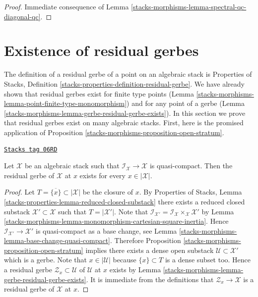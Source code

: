 \begin{proof}
Immediate consequence of Lemma \ref{stacks-morphisms-lemma-spectral-qc-diagonal-qc}.
\end{proof}

\section{Existence of residual gerbes}
\label{stacks-morphisms-section-existence-residual-gerbes}
The definition of a residual gerbe of a point on an algebraic stack
is Properties of Stacks, Definition
\ref{stacks-properties-definition-residual-gerbe}.
We have already shown that residual gerbes exist for finite type
points (Lemma \ref{stacks-morphisms-lemma-point-finite-type-monomorphism})
and for any point of a gerbe (Lemma \ref{stacks-morphisms-lemma-gerbe-residual-gerbe-exists}).
In this section we prove that residual gerbes
exist on many algebraic stacks. First, here is the promised
application of
Proposition \ref{stacks-morphisms-proposition-open-stratum}.

\begin{lemma}
\label{stacks-morphisms-lemma-every-point-residual-gerbe}
\href{https://stacks.math.columbia.edu/tag/06RD}{\texttt{Stacks tag 06RD}}

Let $\mathcal{X}$ be an algebraic stack such that
$\mathcal{I}_\mathcal{X} \to \mathcal{X}$ is quasi-compact.
Then the residual gerbe of $\mathcal{X}$ at $x$ exists for
every $x \in |\mathcal{X}|$.
\end{lemma}

\begin{proof}
Let $T = \overline{\{x\}} \subset |\mathcal{X}|$ be the closure of $x$.
By
Properties of Stacks, Lemma
\ref{stacks-properties-lemma-reduced-closed-substack}
there exists a reduced closed substack $\mathcal{X}' \subset \mathcal{X}$
such that $T = |\mathcal{X}'|$. Note that
$\mathcal{I}_{\mathcal{X}'} =
\mathcal{I}_\mathcal{X} \times_\mathcal{X} \mathcal{X}'$ by
Lemma \ref{stacks-morphisms-lemma-monomorphism-cartesian-square-inertia}.
Hence $\mathcal{I}_{\mathcal{X}'} \to \mathcal{X}'$ is
quasi-compact as a base change, see
Lemma \ref{stacks-morphisms-lemma-base-change-quasi-compact}.
Therefore
Proposition \ref{stacks-morphisms-proposition-open-stratum}
implies there exists a dense open substack
$\mathcal{U} \subset \mathcal{X}'$
which is a gerbe. Note that $x \in |\mathcal{U}|$ because $\{x\} \subset T$
is a dense subset too. Hence a residual gerbe
$\mathcal{Z}_x \subset \mathcal{U}$ of $\mathcal{U}$ at $x$ exists by
Lemma \ref{stacks-morphisms-lemma-gerbe-residual-gerbe-exists}.
It is immediate from the definitions that $\mathcal{Z}_x \to \mathcal{X}$
is a residual gerbe of $\mathcal{X}$ at $x$.
\end{proof}

